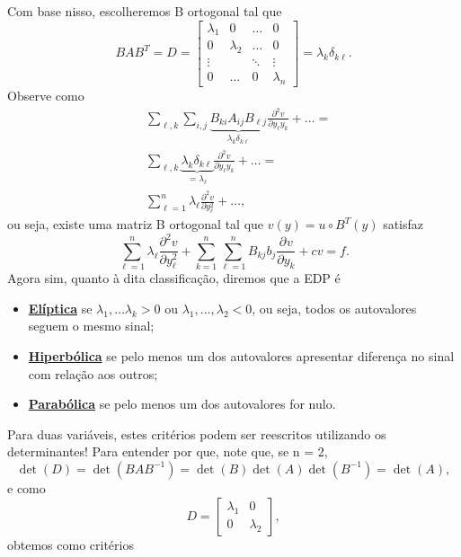 \documentclass[.../pde_notes.tex]{subfiles}
\begin{document}
Com base nisso, escolheremos B ortogonal tal que
\[
	BAB^{T} = D = \begin{bmatrix}
		\lambda_{1} & 0           & \dotsc & 0           \\
		0           & \lambda_{2} & \dotsc & 0           \\
		\vdots      &             & \ddots & \vdots      \\
		0           & \dotsc      & 0      & \lambda_{n}
	\end{bmatrix} = \lambda_{k}\delta_{k\ell }.
\]
Observe como
\begin{align*}
	 & \sum\limits_{\ell , k}^{}\sum\limits_{i, j}^{} \underbrace{B_{ki}A_{ij}B_{\ell j}}_{\lambda_{k}\delta_{k\ell}}\frac{\partial^{2}v}{\partial y_{\ell}y_{k}^{}} + \dotsc = \\
	 & \sum\limits_{\ell , k}^{}\underbrace{\lambda_{k}\delta_{k\ell }}_{=\lambda_{\ell} }\frac{\partial^{2}v}{\partial y_{\ell}y_{k}^{}} + \dotsc                   =          \\
	 & \sum\limits_{\ell = 1}^{n}\lambda_{\ell}\frac{\partial^{2}v}{\partial y_{\ell}^{2}} + \dotsc,
\end{align*}
ou seja, existe uma matriz B ortogonal tal que \(v(y) = u \circ B^{T}(y)\) satisfaz
\[
	\sum\limits_{\ell =1}^{n}\lambda_{\ell}\frac{\partial^{2}v}{\partial y_{\ell}^{2}} + \sum\limits_{k=1}^{n}\sum\limits_{\ell =1}^{n}B_{kj}b_{j}\frac{\partial^{}v}{\partial y_{k}^{}} + cv = f.
\]
Agora sim, quanto à dita classificação, diremos que a EDP é
\begin{itemize}
	\item \underline{\textbf{Elíptica}} se \(\lambda_{1},\dotsc \lambda_{k} > 0\) ou \(\lambda_{1}, \dotsc , \lambda_{2} < 0\), ou seja, todos os autovalores seguem o mesmo sinal;
	\item \underline{\textbf{Hiperbólica}} se pelo menos um dos autovalores apresentar diferença no sinal com relação aos outros;
	\item \underline{\textbf{Parabólica}} se pelo menos um dos autovalores for nulo.
\end{itemize}
Para duas variáveis, estes critérios podem ser reescritos utilizando os determinantes! Para entender por que, note que, se n = 2,
\[
	\det{(D)} = \det{(BAB^{-1})} = \det{(B)}\det{(A)}\det{(B^{-1})} = \det{(A)},
\]
e como
\[
	D = \begin{bmatrix}
		\lambda_1 & 0         \\
		0         & \lambda_2
	\end{bmatrix},
\]
obtemos como critérios
\end{document}
